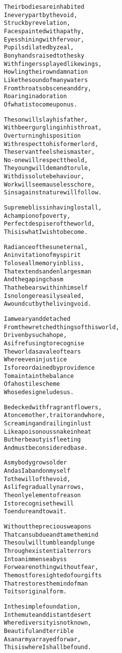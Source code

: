 \documentclass{article}
\begin{document}
\begin{alltt}
Their bodies are inhabited
In every part by the void,
Struck by revelation,
Faces painted with apathy,
Eyes shining with fervour,
Pupils dilated by zeal,
Bony hands raised to the sky
With fingers splayed like wings,
Howling their own damnation
Like the sound of many waters
From throats obscene and dry,
Roaring in adoration
Of what is to come upon us.

The son will slay his father,
With beer gurgling in his throat,
Overturning his position
With respect to his former lord,
The servant feels he is master,
No-one will respect the old,
The young will demand to rule,
With dissolute behaviour,
Work will seem a useless chore,
Sins against nature will follow.

Supreme bliss in having lost all,
A champion of poverty,
Perfect despiser of the world,
This is what I wish to become.

Radiance of the sun eternal,
An invitation of my spirit
To lose all memory in bliss,
That extends and enlarges man
And the gaping chasm
That he bears within himself
Is no longer easily sealed,
A wound cut by the living void.

I am weary and detached
From the wretched things of this world,
Driven by such a hope,
As if refusing to recognise
The world as a vale of tears
Where even injustice
Is foreordained by providence
To maintain the balance
Of a hostile scheme
Whose design eludes us.

Bedecked with fragrant flowers,
At once mother, traitor and whore,
Screaming and railing in lust
Like a poisonous snake in heat
But her beauty is fleeting
And must be considered base.

As my body grows older
And as I abandon myself
To the will of the void,
As life gradually narrows,
The only element of reason
Is to recognise the will
To endure and to wait.

Without the precious weapons
That can subdue and tame the mind
The soul will tumble and plunge
Through existential terrors
Into an immense abyss
For we are nothing without fear,
The most foresighted of our gifts
That restores the mind of man
To its original form.

In the simple foundation,
In the mute and distant desert
Where diversity is not known,
Beautiful and terrible
As an army arrayed for war,
This is where I shall be found.
\end{alltt}

\iffalse
Holding up one finger as if in admonition
Immersed in gloom
The void can be named only through the most distorted things
Nothing exists that so fills and binds the heart as love does
On this side the choir of angels, on that the gaping maw of hell
What first triumphed in its folly and took delight in its jesting now is here punished and rewarded, liberated from the seduction of the passions, rigidified by eternity, consigned to the eternal frost that is to preserve and purify it, saved from corruption through the triumph of corruption
The people are transformed into an assembly belched forth from the abysms of the unknown earth
\fi
\end{document}
